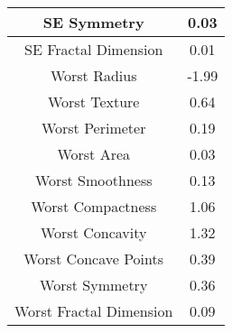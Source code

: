 \documentclass[conference]{IEEEtran}
\begin{document}
\begin{table}[]
\begin{tabular}{|c|c|}
             SE Symmetry & 0.03\\
             \hline
             SE Fractal Dimension & 0.01\\
             \hline
             Worst Radius & -1.99\\
             \hline
             Worst Texture & 0.64\\
             \hline
             Worst Perimeter & 0.19\\
             \hline
             Worst Area & 0.03\\
             \hline
             Worst Smoothness & 0.13\\
             \hline
             Worst Compactness & 1.06\\
             \hline
             Worst Concavity & 1.32\\
             \hline
             Worst Concave Points & 0.39\\
             \hline
             Worst Symmetry & 0.36\\
             \hline
             Worst Fractal Dimension & 0.09\\
             \hline
        \end{tabular}
    \end{table}
\end{document}
